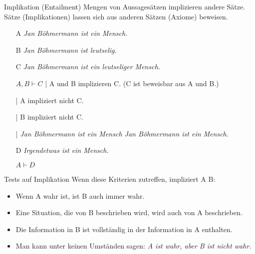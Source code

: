 \begin{frame}
  {Implikation (Entailment)}
  \onslide<+->
  \onslide<+->
  Mengen von Aussagesätzen \alert{implizieren} andere Sätze.\\
  \onslide<+->
  Sätze (Implikationen) lassen sich aus anderen Sätzen (Axiome) \alert{beweisen}.\\
  \Halbzeile
  \begin{itemize}[<+->]
    \item[A] \textit{Jan Böhmermann ist ein Mensch.}
    \item[B] \textit{Jan Böhmermann ist leutselig.}
    \item[C] \textit{Jan Böhmermann ist ein leutseliger Mensch.}
      \Halbzeile
    \item[ ] \alert{$A,B\vdash C$} | A und B implizieren C. (C ist beweisbar aus A und B.)
    \item[ ]  | A impliziert nicht C.
    \item[ ]  | B impliziert nicht C.
      \Halbzeile
    \item[ ]  \onslide<+->| \textit{Jan Böhmermann ist ein Mensch  Jan Böhmermann ist ein Mensch.}
      \Halbzeile
    \item[D] \textit{Irgendetwas ist ein Mensch.}
    \item[ ] \alert{$A\vdash D$} 
  \end{itemize}
\end{frame}

\begin{frame}
  {Tests auf Implikation}
  \onslide<+->
  \onslide<+->
  Wenn diese Kriterien zutreffen, impliziert A B:\\
  \Zeile
  \begin{itemize}[<+->]
    \item Wenn A wahr ist, ist B auch immer wahr.
    \item Eine Situation, die von B beschrieben wird, wird auch von A beschrieben.
    \item Die Information in B ist vollständig in der Information in A enthalten.
    \item Man kann unter keinen Umständen sagen: \textit{A ist wahr, aber B ist nicht wahr.}
  \end{itemize}
\end{frame}

